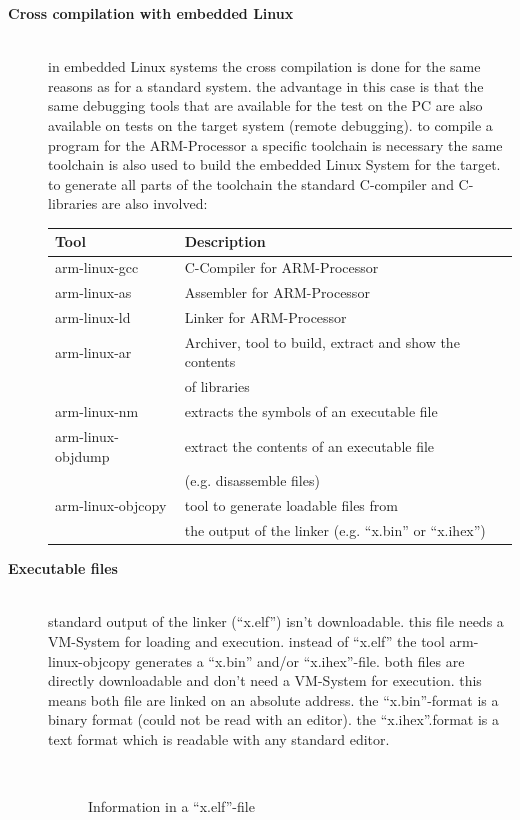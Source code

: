 \os{\newpage}
\begin{description}
\item [{\rot\bf Cross compilation with embedded Linux}]~\\[-3ex]
\bigskip
\bi
	\ite in embedded Linux systems the cross compilation is done for the same reasons as for a standard system.
	\ite the advantage in this case is that the same debugging tools that are available for the test on the PC are also available on tests on the target system (remote debugging).
	\bigskip
	\ite to compile a program for the ARM-Processor a specific toolchain is necessary
	\ite the same toolchain is also used to build the embedded Linux System for the target.
	\ite to generate all parts of the toolchain the standard C-compiler and C-libraries are also involved:
\ei
\os{\newpage}
\begin{center}
 \begin{tabular}{|l|l|}
\hline
Tool & Description\\
\hline
arm-linux-gcc & C-Compiler for ARM-Processor\\
\hline
arm-linux-as & Assembler for ARM-Processor\\
\hline
arm-linux-ld & Linker for ARM-Processor\\
\hline
\hline
arm-linux-ar & Archiver, tool to build, extract and show the contents \\  & of libraries \\
\hline
arm-linux-nm & extracts the symbols of an executable file\\
\hline
arm-linux-objdump & extract the contents of an executable file \\
 & (e.g. disassemble files)\\
\hline
arm-linux-objcopy & tool to generate loadable files from \\
 & the output of the linker (e.g. ``x.bin'' or ``x.ihex'') \\
\hline
 \end{tabular}
\end{center}
\os{\newpage}
\item [{\rot\bf Executable files}]~\\[-3ex]	
\bigskip
\bi
	\ite standard output of the linker (``x.elf'') isn't downloadable.
	\bi
		\ite this file needs a VM-System for loading and execution.
	\ei
	\bigskip
	\ite instead of ``x.elf'' the tool arm-linux-objcopy generates a ``x.bin'' and/or ``x.ihex''-file.
	\bi
		\ite both files are directly downloadable and don't need a VM-System for execution.
		\ite this means both file are linked on an absolute address.
		\ite the ``x.bin''-format is a binary format (could not be read with an editor).
		\ite the ``x.ihex''.format is a text format which is readable with any standard editor.
	\ei
\ei
\os{\newpage}
\begin{figure}[!hbtp]
     \begin{center}
	  \\
	  \caption{Information in a ``x.elf''-file}
     \end{center}
\end{figure}



\end{description}
